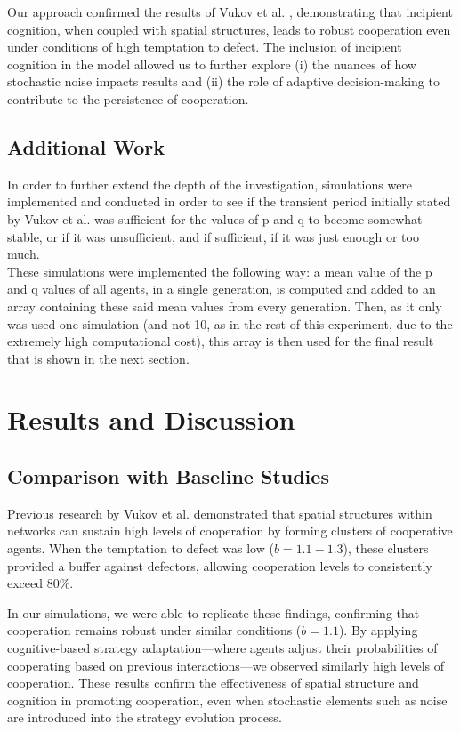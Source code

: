 \documentclass[runningheads]{llncs}
\begin{document}
Our approach confirmed the results of Vukov et al. \cite{vukov}, demonstrating that
incipient cognition, when coupled with spatial structures, leads to robust
cooperation even under conditions of high temptation to defect.
The inclusion of incipient cognition in the model allowed us to further
explore (i) the nuances of how stochastic noise impacts results and (ii) the role
of adaptive decision-making to contribute to the persistence of cooperation.


\subsection{Additional Work}

In order to further extend the depth of the investigation, simulations were
implemented and conducted in order to see if the transient period initially
stated by Vukov et al. was sufficient for the values of p and q to become
somewhat stable, or if it was unsufficient, and if sufficient, if it was just
enough or too much.\\
These simulations were implemented the following way: a mean value of the
p and q values of all agents, in a single generation, is computed and added to an
array containing these said mean values from every generation. Then, as it only
was used one simulation (and not 10, as in the rest of this experiment, due
to the extremely high computational cost), this array is then used for the
final result that is shown in the next section.



\section{Results and Discussion}

\subsection{Comparison with Baseline Studies}
Previous research by Vukov et al. demonstrated that spatial structures within networks can sustain high levels of cooperation by forming clusters of cooperative agents. When the temptation to defect was low (\( b = 1.1 - 1.3 \)), these clusters provided a buffer against defectors, allowing cooperation levels to consistently exceed 80\%.

In our simulations, we were able to replicate these findings, confirming that cooperation remains robust under similar
conditions (\( b = 1.1 \)). By applying cognitive-based strategy
adaptation—where agents adjust their probabilities of cooperating based on
previous interactions—we observed similarly high levels of cooperation.
These results confirm the effectiveness of spatial structure and cognition in
promoting cooperation, even when stochastic elements such as noise are
introduced into the strategy evolution process.
\end{document}
